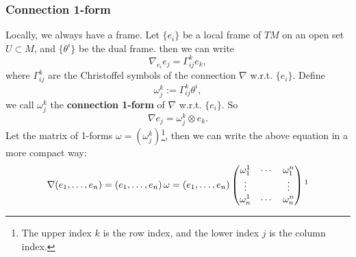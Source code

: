 \subsubsection{Connection 1-form}
Locally, we always have a frame. Let $\{e_i\}$ be a local frame of $TM$ on an open set $U\subset M$, 
and $\{\theta^i\}$ be the dual frame.
then we can write 
\begin{equation*}
    \nabla_{e_i}e_j = \Gamma_{ij}^k e_k,
\end{equation*}
where $\Gamma_{ij}^k$ are the Christoffel symbols of the connection $\nabla$ w.r.t. $\{e_i\}$. 
Define 
\begin{equation*}
    \omega_j^k := \Gamma_{ij}^k \theta^i,
\end{equation*}
we call $\omega_j^k$ the \textbf{connection 1-form} of $\nabla$ w.r.t. $\{e_i\}$. 
So
\begin{equation*}
    \nabla e_j = \omega_j^k \otimes e_k.
\end{equation*}
Let the matrix of 1-forms $\omega = (\omega_j^k)$\footnote{The upper index $k$ is the row index, 
and the lower index $j$ is the column index.}, 
then we can write the above equation in a more compact way:
\begin{equation*}
    \nabla (\ft{e}{1}{n}) = (\ft{e}{1}{n})\,\omega = 
    (\ft{e}{1}{n})
    \begin{pmatrix}
        \omega_1^1 & \cdots & \omega_1^n \\
        \vdots &  & \vdots \\
        \omega_n^1 & \cdots & \omega_n^n
    \end{pmatrix}
    \footnotemark
\end{equation*}


